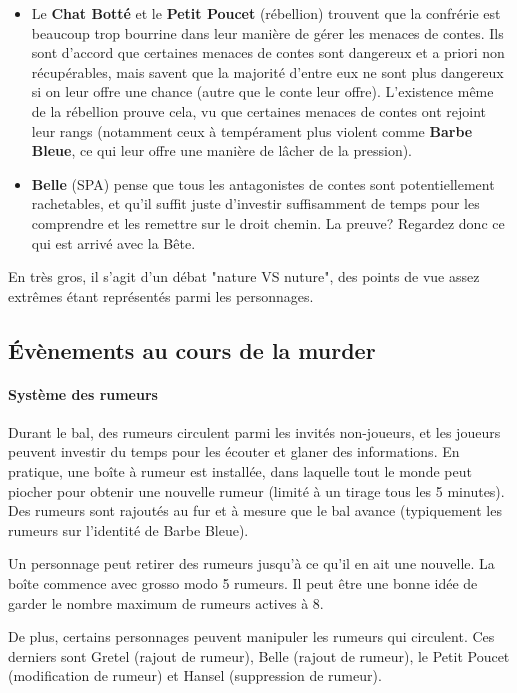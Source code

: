 {\begin{itemize}
		\item Le \textbf{Chat Botté} et le \textbf{Petit Poucet} (rébellion) trouvent que la confrérie est beaucoup trop bourrine dans leur manière de gérer les menaces de contes. Ils sont d'accord que certaines menaces de contes sont dangereux et a priori non récupérables, mais savent que la majorité d'entre eux ne sont plus dangereux si on leur offre une chance (autre que le conte leur offre). L'existence même de la rébellion prouve cela, vu que certaines menaces de contes ont rejoint leur rangs (notamment ceux à tempérament plus violent comme \textbf{Barbe Bleue}, ce qui leur offre une manière de lâcher de la pression).
		
		\item \textbf{Belle} (SPA) pense que tous les antagonistes de contes sont potentiellement rachetables, et qu'il suffit juste d'investir suffisamment de temps pour les comprendre et les remettre sur le droit chemin. La preuve? Regardez donc ce qui est arrivé avec la Bête.
	\end{itemize}
	En très gros, il s'agit d'un débat "nature VS nuture", des points de vue assez extrêmes étant représentés parmi les personnages.
	
	
	
	\subsection{Évènements au cours de la murder}
	
	\paragraph{Système des rumeurs} Durant le bal, des rumeurs circulent parmi les invités non-joueurs, et les joueurs peuvent investir du temps pour les écouter et glaner des informations. En pratique, une boîte à rumeur est installée, dans laquelle tout le monde peut piocher pour obtenir une nouvelle rumeur (limité à un tirage tous les 5 minutes). Des rumeurs sont rajoutés au fur et à mesure que le bal avance (typiquement les rumeurs sur l'identité de Barbe Bleue).
	
	Un personnage peut retirer des rumeurs jusqu'à ce qu'il en ait une nouvelle. La boîte commence avec grosso modo 5 rumeurs. Il peut être une bonne idée de garder le nombre maximum de rumeurs actives à 8.
	
	\par De plus, certains personnages peuvent manipuler les rumeurs qui circulent. Ces derniers sont Gretel (rajout de rumeur), Belle (rajout de rumeur), le Petit Poucet (modification de rumeur) et Hansel (suppression de rumeur).
	
}
